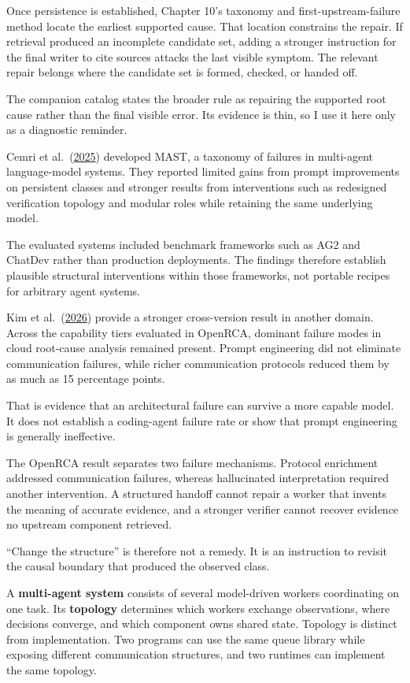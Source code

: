 Once persistence is established, Chapter 10's taxonomy and first-upstream-failure method locate the earliest supported cause. That location constrains the repair. If retrieval produced an incomplete candidate set, adding a stronger instruction for the final writer to cite sources attacks the last visible symptom. The relevant repair belongs where the candidate set is formed, checked, or handed off.

The companion catalog states the broader rule as repairing the supported root cause rather than the final visible error. Its evidence is thin, so I use it here only as a diagnostic reminder.

Cemri et al.~(\href{https://arxiv.org/abs/2503.13657}{2025}) developed MAST, a taxonomy of failures in multi-agent language-model systems. They reported limited gains from prompt improvements on persistent classes and stronger results from interventions such as redesigned verification topology and modular roles while retaining the same underlying model.

The evaluated systems included benchmark frameworks such as AG2 and ChatDev rather than production deployments. The findings therefore establish plausible structural interventions within those frameworks, not portable recipes for arbitrary agent systems.

Kim et al.~(\href{https://arxiv.org/abs/2602.09937}{2026}) provide a stronger cross-version result in another domain. Across the capability tiers evaluated in OpenRCA, dominant failure modes in cloud root-cause analysis remained present. Prompt engineering did not eliminate communication failures, while richer communication protocols reduced them by as much as 15 percentage points.

That is evidence that an architectural failure can survive a more capable model. It does not establish a coding-agent failure rate or show that prompt engineering is generally ineffective.

The OpenRCA result separates two failure mechanisms. Protocol enrichment addressed communication failures, whereas hallucinated interpretation required another intervention. A structured handoff cannot repair a worker that invents the meaning of accurate evidence, and a stronger verifier cannot recover evidence no upstream component retrieved.

``Change the structure'' is therefore not a remedy. It is an instruction to revisit the causal boundary that produced the observed class.

A \textbf{multi-agent system} consists of several model-driven workers coordinating on one task. Its \textbf{topology} determines which workers exchange observations, where decisions converge, and which component owns shared state. Topology is distinct from implementation. Two programs can use the same queue library while exposing different communication structures, and two runtimes can implement the same topology.

